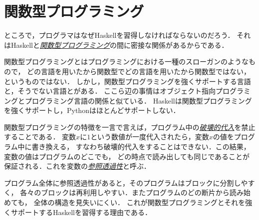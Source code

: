 \documentclass[a5paper,draft]{jsbook}
\newcommand{\programminglanguage}[1]{\textsf{#1}}
\newcommand{\haskell}{\programminglanguage{Haskell}}
\newcommand{\python}{\programminglanguage{Python}}
\newcommand{\keyword}[1]{{\underline{\emph{#1}}}}
\begin{document}
\section{関数型プログラミング}

ところで，プログラマはなぜ\haskell を習得しなければならないのだろう．
それは\haskell と\keyword{関数型プログラミング}の間に密接な関係があるからである．

関数型プログラミングとはプログラミングにおける一種のスローガンのようなもので，
どの言語を用いたから関数型でどの言語を用いたから関数型ではない，というものではない．
しかし，関数型プログラミングを強くサポートする言語と，そうでない言語とがある．
ここら辺の事情はオブジェクト指向プログラミングとプログラミング言語の関係と似ている．
\haskell は関数型プログラミングを強くサポートし，\python はほとんどサポートしない．

関数型プログラミングの特徴を一言で言えば，プログラム中の\keyword{破壊的代入}を禁止することである．
変数$x$に$1$という数値が一度代入されたら，変数$x$の値をプログラム中に書き換える，
すなわち破壊的代入をすることはできない．この結果，変数の値はプログラムのどこでも，
どの時点で読み出しても同じであることが保証される．これを変数の\keyword{参照透過性}と呼ぶ．

プログラム全体に参照透過性があると，そのプログラムはブロックに分割しやすく，
各々のブロックは再利用しやすい．またプログラムのどの断片から読み始めても，
全体の構造を見失いにくい．
これが関数型プログラミングとそれを強くサポートする\haskell を習得する理由である．





\end{document}
